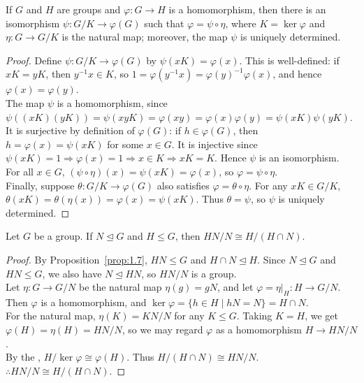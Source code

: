\documentclass[../Odyssey_Project.tex]{subfiles}
\begin{document}
\begin{namedtheorem}
\label{thm:fth}
If $G$ and $H$ are groups and $\varphi : G \to H$ is a homomorphism, then there is an isomorphism $\psi : G/K \to \varphi(G)$ such that $\varphi = \psi \circ \eta$, where $K = \ker \varphi$ and $\eta : G \to G/K$ is the natural map; moreover, the map $\psi$ is uniquely determined.
\end{namedtheorem}
\begin{proof}
    Define \(\psi \colon G/K \to \varphi(G)\) by \(\psi(xK) = \varphi(x)\). This is well-defined: if \(xK = yK\), then \(y^{-1}x \in K\), so \(1 = \varphi(y^{-1}x) = \varphi(y)^{-1}\varphi(x)\), and hence \(\varphi(x) = \varphi(y)\). \\
    The map \(\psi\) is a homomorphism, since \(\psi((xK)(yK)) = \psi(xyK) = \varphi(xy) = \varphi(x)\varphi(y) = \psi(xK)\psi(yK)\). \\
    It is surjective by definition of \(\varphi(G)\): if \(h \in \varphi(G)\), then \(h = \varphi(x) = \psi(xK)\) for some \(x \in G\). It is injective since \(\psi(xK) = 1 \Rightarrow \varphi(x) = 1 \Rightarrow x \in K \Rightarrow xK = K\). Hence \(\psi\) is an isomorphism. \\
    For all \(x \in G\), \((\psi \circ \eta)(x) = \psi(xK) = \varphi(x)\), so \(\varphi = \psi \circ \eta\). \\
    Finally, suppose \(\theta \colon G/K \to \varphi(G)\) also satisfies \(\varphi = \theta \circ \eta\). For any \(xK \in G/K\), \(\theta(xK) = \theta(\eta(x)) = \varphi(x) = \psi(xK)\). Thus \(\theta = \psi\), so \(\psi\) is uniquely determined.
\end{proof}

\begin{namedtheorem}
\label{thm:first-iso}
Let $G$ be a group. If $N \trianglelefteq G$ and $H \leq G$, then $HN/N \cong H/(H \cap N)$.
\end{namedtheorem}
\begin{proof}
    By Proposition~\ref{prop:1.7}, \(HN \leq G\) and \(H \cap N \trianglelefteq H\). Since \(N \trianglelefteq G\) and \(HN \leq G\), we also have \(N \trianglelefteq HN\), so \(HN/N\) is a group. \\
    Let \(\eta \colon G \to G/N\) be the natural map \(\eta(g) = gN\), and let \(\varphi = \eta|_H \colon H \to G/N\). Then \(\varphi\) is a homomorphism, and \(\ker \varphi = \{h \in H \mid hN = N\} = H \cap N\). \\
    For the natural map, \(\eta(K) = KN/N\) for any \(K \leq G\). Taking \(K = H\), we get \(\varphi(H) = \eta(H) = HN/N\), so we may regard \(\varphi\) as a homomorphism \(H \to HN/N\). \\
    By the , \(H/\ker \varphi \cong \varphi(H)\). Thus \(H/(H \cap N) \cong HN/N\). \\
    \(\therefore HN/N \cong H/(H \cap N)\).
\end{proof}
\end{document}

